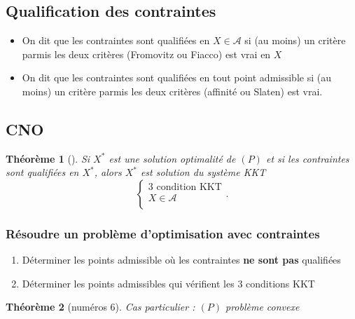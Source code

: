 \documentclass{article}
\theoremstyle{plain}%
\newtheorem{thm}{Théorème}[section]
\theoremstyle{definition}
\begin{document}
\subsection{Qualification des contraintes}
\begin{itemize}
    \item On dit que les contraintes sont qualifiées en $ X \in \mathcal{A} $ si (au moins) un critère parmis les deux critères (Fromovitz ou Fiacco) est vrai en $ X $ 
    \item On dit que les contraintes sont qualifiées en tout point admissible si (au moins) un critère parmis les deux critères (affinité ou Slaten) est vrai.
\end{itemize}

\subsection{CNO}
\begin{thm}[]
    Si $ X^* $ est une solution optimalité de $ (P) $  et si les contraintes sont qualifiées en $ X^* $, alors $ X^* $ est solution du système KKT 
    \[
        \begin{cases}
        3 \text{ condition KKT}\\
        X \in \mathcal{A}\\
        \end{cases} 
    .\]
\end{thm}

\subsubsection{Résoudre un problème d'optimisation avec contraintes}
\begin{enumerate}
    \item Déterminer les points admissible où les contraintes \textbf{ne sont pas} qualifiées 
    \item Déterminer les points admissibles qui vérifient les 3 conditions KKT
\end{enumerate}
\begin{thm}[numéros 6]
    Cas particulier : $ (P) $ problème convexe
\end{thm}
\end{document}
